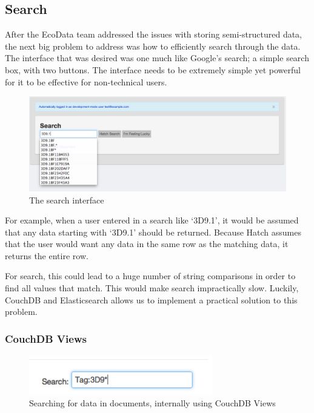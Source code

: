 \subsection{Search}
After the EcoData team addressed the issues with storing semi-structured data, the next 
big problem to address was how to efficiently search through the data. The interface 
that was desired was one much like Google's search; a simple search box, with two
buttons. The interface needs to be extremely simple yet powerful for it to be 
effective for non-technical users. 

\begin{figure}[h]
	\begin{center}
	\includegraphics[width=120mm]{images/search_ss1}
	\caption{The search interface} 
	\label{search_ss1}
	\end{center}
\end{figure}

For example, when a user entered in a search like `3D9.1', it would be assumed that 
any data starting with `3D9.1' should be returned. Because Hatch assumes that
the user would want any data in the same row as the matching data, it returns
the entire row. 

For search, this could lead to a huge number of string comparisons in order to find
all values that match. This would make search impractically slow. Luckily, CouchDB and 
Elasticsearch allows us to implement a practical solution to this problem.

\subsubsection{CouchDB Views}

\begin{figure}[h]
	\begin{center}
	\includegraphics[width=80mm]{images/demo_search_01}
	\caption{Searching for data in documents, internally using CouchDB Views} 
	\label{demo_search_01}
	\end{center}
\end{figure}

